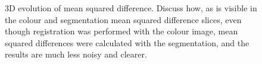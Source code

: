 \begin{figure}
    \caption{3D evolution of mean squared difference. Discuss how, as is visible in the colour and segmentation mean squared difference slices, even though registration was performed with the colour image, mean squared differences were calculated with the segmentation, and the results are much less noisy and clearer.}
    \label{fig:dummy_cross_sections}
  \end{figure}
  

